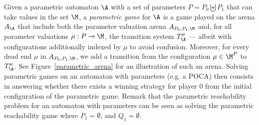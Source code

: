 Given a parametric automaton $\A$ with a set of parameters $P = P_0 \biguplus P_1$ that can take 
values in the set $\M$,
a {\em parametric game} for $\A$ is a game played 
on the %
arena $A_\A$
that include both 
the parameter valuation arena
$A_{P_0, P_1,\M}$
and, %
for all parameter valuations $\mu: P\rightarrow \M$,
the transition system %
 $T_\A^\mu$
\---- albeit with configurations additionally indexed by $\mu$ %
 to avoid confusion.
Moreover, for every 
dead end $\mu$
 in $A_{P_0,P_1,\M}$,
we add a transition
from the configuration $\mu \in \M^P$ to
$T_\A^\mu$.
See Figure~\ref{parametric_arena} for an illustration of such an arena.
Solving parametric games on an automaton with parameters (e.g. a POCA) then consists in answering whether there exists 
a winning strategy for player $0$
from the initial configuration of the parametric game.
Remark that the parametric reachability problem for an automaton with parameters can be seen as solving the parametric reachability game where $P_1 = \emptyset$, and $Q_1 = \emptyset$. 

